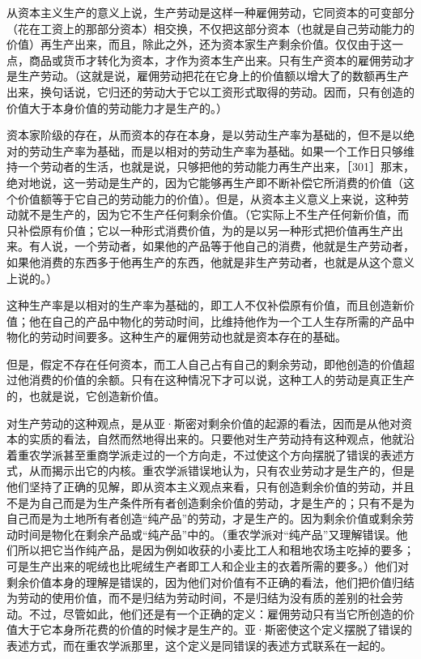 从资本主义生产的意义上说，生产劳动是这样一种雇佣劳动，它同资本的可变部分（花在工资上的那部分资本）相交换，不仅把这部分资本（也就是自己劳动能力的价值）再生产出来，而且，除此之外，还为资本家生产剩余价值。仅仅由于这一点，商品或货币才转化为资本，才作为资本生产出来。只有生产资本的雇佣劳动才是生产劳动。（这就是说，雇佣劳动把花在它身上的价值额以增大了的数额再生产出来，换句话说，它归还的劳动大于它以工资形式取得的劳动。因而，只有创造的价值大于本身价值的劳动能力才是生产的。）

资本家阶级的存在，从而资本的存在本身，是以劳动生产率为基础的，但不是以绝对的劳动生产率为基础，而是以相对的劳动生产率为基础。如果一个工作日只够维持一个劳动者的生活，也就是说，只够把他的劳动能力再生产出来，［301］那末，绝对地说，这一劳动是生产的，因为它能够再生产即不断补偿它所消费的价值（这个价值额等于它自己的劳动能力的价值）。但是，从资本主义意义上来说，这种劳动就不是生产的，因为它不生产任何剩余价值。（它实际上不生产任何新价值，而只补偿原有价值；它以一种形式消费价值，为的是以另一种形式把价值再生产出来。有人说，一个劳动者，如果他的产品等于他自己的消费，他就是生产劳动者，如果他消费的东西多于他再生产的东西，他就是非生产劳动者，也就是从这个意义上说的。）

这种生产率是以相对的生产率为基础的，即工人不仅补偿原有价值，而且创造新价值；他在自己的产品中物化的劳动时间，比维持他作为一个工人生存所需的产品中物化的劳动时间要多。这种生产的雇佣劳动也就是资本存在的基础。

\fontbox{~\{}但是，假定不存在任何资本，而工人自己占有自己的剩余劳动，即他创造的价值超过他消费的价值的余额。只有在这种情况下才可以说，这种工人的劳动是真正生产的，也就是说，它创造新价值。\fontbox{\}~}


对生产劳动的这种观点，是从亚·斯密对剩余价值的起源的看法，因而是从他对资本的实质的看法，自然而然地得出来的。只要他对生产劳动持有这种观点，他就沿着重农学派甚至重商学派走过的一个方向走，不过使这个方向摆脱了错误的表述方式，从而揭示出它的内核。重农学派错误地认为，只有农业劳动才是生产的，但是他们坚持了正确的见解，即从资本主义观点来看，只有创造剩余价值的劳动，并且不是为自己而是为生产条件所有者创造剩余价值的劳动，才是生产的；只有不是为自己而是为土地所有者创造“纯产品”的劳动，才是生产的。因为剩余价值或剩余劳动时间是物化在剩余产品或“纯产品”中的。（重农学派对“纯产品”又理解错误。他们所以把它当作纯产品，是因为例如收获的小麦比工人和租地农场主吃掉的要多；可是生产出来的呢绒也比呢绒生产者即工人和企业主的衣着所需的要多。）他们对剩余价值本身的理解是错误的，因为他们对价值有不正确的看法，他们把价值归结为劳动的使用价值，而不是归结为劳动时间，不是归结为没有质的差别的社会劳动。不过，尽管如此，他们还是有一个正确的定义：雇佣劳动只有当它所创造的价值大于它本身所花费的价值的时候才是生产的。亚·斯密使这个定义摆脱了错误的表述方式，而在重农学派那里，这个定义是同错误的表述方式联系在一起的。

